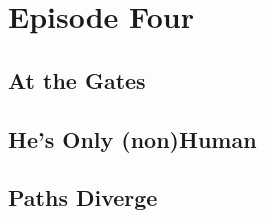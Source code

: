 \documentclass[././main.tex]{subfiles}
\begin{document}
\section{Episode Four}
\subsection{At the Gates}
\subsection{He's Only (non)Human}
\subsection{Paths Diverge}
\end{document}

